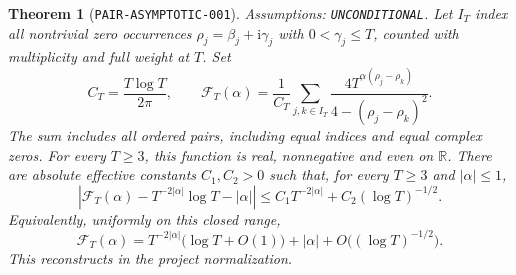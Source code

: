\documentclass[11pt]{article}
\newtheorem{theorem}[lemma]{Theorem}
\newcommand{\ii}{\mathrm i}
\begin{document}
\begin{theorem}[\texttt{PAIR-ASYMPTOTIC-001}]\label{thm:pair-asymptotic}
Assumptions: \texttt{UNCONDITIONAL}.
Let \(I_T\) index all nontrivial zero occurrences
\(\rho_j=\beta_j+\ii\gamma_j\) with \(0<\gamma_j\leq T\), counted with
multiplicity and full weight at \(T\). Set
\[
 C_T=\frac{T\log T}{2\pi},\qquad
 \mathcal F_T(\alpha)=\frac1{C_T}
 \sum_{j,k\in I_T}
 \frac{4T^{\alpha(\rho_j-\rho_k)}}{4-(\rho_j-\rho_k)^2}.
\]
The sum includes all ordered pairs, including equal indices and equal
complex zeros. For every \(T\geq3\), this function is real, nonnegative
and even on \(\mathbb R\). There are absolute effective constants
\(C_1,C_2>0\) such that, for every \(T\geq3\) and \(|\alpha|\leq1\),
\begin{equation}\label{eq:pair-asymptotic-bound}
 \left|\mathcal F_T(\alpha)-T^{-2|\alpha|}\log T-|\alpha|\right|
 \leq C_1T^{-2|\alpha|}+C_2(\log T)^{-1/2}.
\end{equation}
Equivalently, uniformly on this closed range,
\begin{equation}\label{eq:pair-asymptotic}
 \mathcal F_T(\alpha)
 =T^{-2|\alpha|}\bigl(\log T+O(1)\bigr)
    +|\alpha|+O\bigl((\log T)^{-1/2}\bigr).
\end{equation}
This reconstructs \cite[Theorem 1, (1.4)]{BGSTB2024} in the project
normalization.
\end{theorem}
\end{document}
